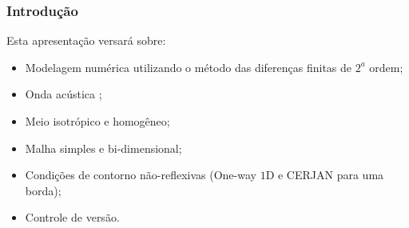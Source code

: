 \documentclass[10pt]{beamer} %
\begin{document}
\begin{frame}
	\frametitle{Introdução}
	\transboxin%
	\begin{block}{Esta apresentação versará sobre:}
		\begin{itemize}
			\pause
			\item Modelagem numérica utilizando o método das diferenças finitas de $2^{a}$ ordem;
			\pause %
			\item Onda acústica ;
			\pause
			\item Meio isotrópico e homogêneo;
			\pause
			\item Malha simples e bi-dimensional;
			\pause
			\item Condições de contorno não-reflexivas (One-way $1$D e CERJAN para uma borda);
			\pause
			\item Controle de versão.
			
			
		\end{itemize}	
	\end{block}
	
\end{frame}






	
	
	
%
%


\end{document}
